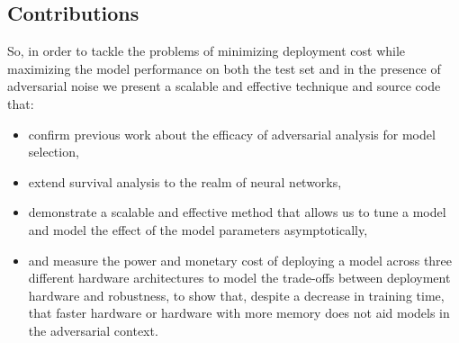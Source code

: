 \documentclass[conference]{IEEEtran}
\begin{document}


\subsection{Contributions}
So, in order to tackle the problems of minimizing deployment cost while maximizing the model performance on both the test set and in the presence of adversarial noise we present a scalable and effective technique and source code that:
\begin{itemize}
    \item confirm previous work about the efficacy of adversarial analysis for model selection,
    \item extend survival analysis to the realm of neural networks, 
    \item demonstrate a scalable and effective method that allows us to tune a model and model the effect of the model parameters asymptotically,
    \item and measure the power and monetary cost of deploying a model across three different hardware architectures to model the trade-offs between deployment hardware and robustness,
to show that, despite a decrease in training time, that faster hardware or hardware with more memory does not aid models in the adversarial context.
    
\end{itemize}
\end{document}
